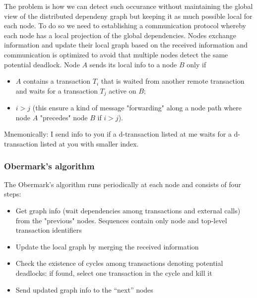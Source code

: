 \newline
The problem is how we can detect such occurance without maintaining the global view of the distributed dependeny graph but keeping it as much possible local for each node. To do so we need to  establishing a communication protocol whereby each node has a local projection of the global dependencies. Nodes exchange information and update their local graph based on the received information and communication is optimized to avoid that multiple nodes detect the same potential deadlock.\newline
\newline
Node $A$ sends its local info to a node $B$ only if
\begin{itemize}
    \item $A$ contains a transaction $T_i$ that is waited from another remote transaction and waits for a transaction $T_j$ active on $B$;
    \item $i>j$ (this ensure a kind of message "forwarding" along a node path where node $A$ "precedes" node $B$ if $i>j$).
\end{itemize}
Mnemonically: I send info to you if a d-transaction listed at me waits for a d-transaction listed at you with smaller index.
\subsubsection{Obermark's algorithm}
The Obermark's algorithm runs periodically at each node and consists of four steps:
\begin{itemize}
    \item Get graph info (wait dependencies among transactions
    and external calls) from the "previous" nodes.
    Sequences contain only node and top-level transaction
    identifiers
    \item Update the local graph by merging the received
    information
    \item Check the existence of cycles among transactions
    denoting potential deadlocks: if found, select one
    transaction in the cycle and kill it
    \item Send updated graph info to the “next” nodes
\end{itemize}
